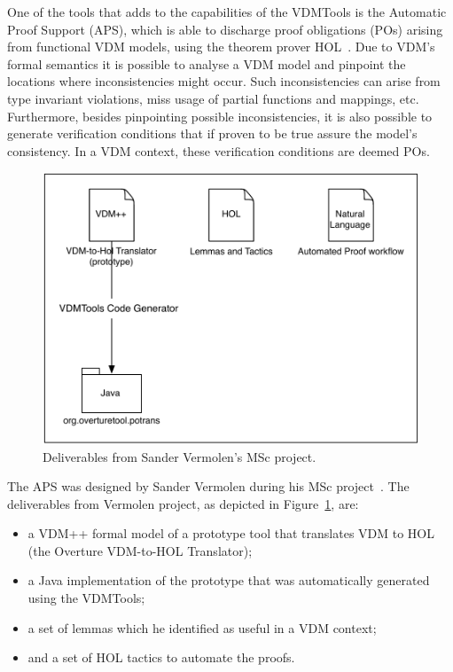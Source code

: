\documentclass[]{article}
\begin{document}
One of the tools that adds to the capabilities of the VDMTools is the Automatic Proof Support (APS), which is able to discharge proof obligations (POs) arising from functional VDM models, using the theorem prover HOL~\cite{DBLP:conf/tphol/Gordon91}.
Due to VDM's formal semantics it is possible to analyse a VDM model and pinpoint the locations where inconsistencies might occur.
Such inconsistencies can arise from type invariant violations, miss usage of partial functions and mappings, etc.
Furthermore, besides pinpointing possible inconsistencies, it is also possible to generate verification conditions that if proven to be true assure the model's consistency.
In a VDM context, these verification conditions are deemed POs.

\begin{figure}
  \begin{center}
    \includegraphics[width=.6\textwidth]{images/vermolen_contribution.pdf}
    \caption[Vermolen's contribution]{Deliverables from Sander Vermolen's MSc project.}
    \label{fig:sander_deliverables}
  \end{center}
\end{figure}

The APS was designed by Sander Vermolen during his MSc project~\cite{Vermolen07}.
The deliverables from Vermolen project, as depicted in Figure~\ref{fig:sander_deliverables}, are:
\begin{itemize}
  \item a VDM++ formal model of a prototype tool that translates VDM to HOL (the Overture VDM-to-HOL Translator);
  \item a Java implementation of the prototype that was automatically generated using the VDMTools;
  \item a set of lemmas which he identified as useful in a VDM context;
  \item and a set of HOL tactics to automate the proofs.
\end{itemize}
\end{document}
